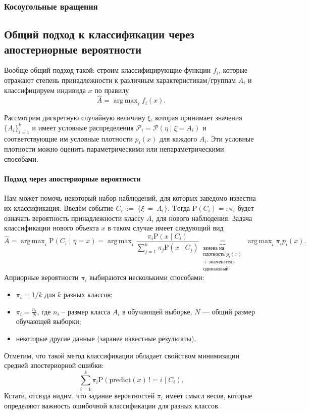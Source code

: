 \documentclass[12pt,a4paper,final]{article}
\newcommand{\1}{\mathds{1}}
\newcommand{\prob}{\mathrm{P}}
\DeclareMathOperator*{\argmax}{arg\,max}
\begin{document}
\subsubsection*{Косоугольные вращения}


\subsection{Общий подход к классификации через апостериорные вероятности}

Вообще общий подход такой: строим классифицирующие функции $f_i$, которые отражают степень принадлежности к различным характеристикам/группам $A_i$ и классифицируем индивида $x$ по правилу
$$
\hat A = \argmax_i f_i(x).
$$

Рассмотрим дискретную случайную величину $\xi$, которая принимает значения $\{A_i\}_{i = 1}^k$ и имеет условные распределения $\mathcal P_i = \mathcal P(\eta \mid \xi = A_i)$ и соответствующие им условные плотности $p_i(x)$ для каждого $A_i$. 
Эти условные плотности можно оценить параметрическими или непараметрическими способами.

\paragraph{Подход через апостериорные вероятности}
Нам может помочь некоторый набор наблюдений, для которых заведомо известна их классификация. Введём событие $C_i~:=~\{\xi~=~A_i\}.$ Tогда $\prob(C_i) =: \pi_i$ будет означать вероятность принадлежности классу $A_i$ для нового наблюдения. Задача классификации нового объекта $x$ в таком случае имеет следующий вид
$$
\hat A = \argmax_i \prob(C_i \mid \eta = x) = \argmax_i \frac{\pi_i \prob(x \mid C_i)}{\sum_{j = 1}^k \pi_j \prob(x \mid C_j)} \underbrace{=}_{\substack{\text{замена на} \\ \text{плотность } p_i(x)\\ + \text{ знаменатель} \\ \text{одинаковый}}} \argmax_i \pi_i p_i(x).
$$
Априорные вероятности $\pi_i$ выбираются несколькими способами:
\begin{itemize}
\item $\pi_i = 1/k$ для $k$ разных классов;
\item  $\pi_i =\frac{n_i}{N}$, где $n_i$ – размер класса $A_i$ в обучающей выборке, $N$ --- общий размер обучающей выборки;
\item некоторые другие данные (заранее известные результаты).
\end{itemize}
Отметим, что такой метод классификации обладает свойством минимизации средней апостериорной ошибки:
$$
\sum_{i = 1}^k \pi_i \prob (\mathrm{predict}(x)\, != i \mid 	C_i).
$$
Кстати, отсюда видим, что задание вероятностей $\pi_i$ имеет смысл весов, которые определяют важность ошибочной классификации для разных классов.
\end{document}
